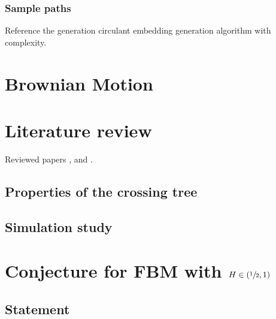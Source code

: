 \documentclass[a4paper]{report}
\begin{document}
\subsubsection{Sample paths} %
\label{ssub:sample_paths}

Reference the generation circulant embedding generation algorithm with complexity.




\section{Brownian Motion} %
\label{sec:brownian_motion}

\section{Literature review} %
\label{sec:literature_review}
Reviewed papers \cite{jones2004}, \cite{jonesshen2005} and \cite{decrouez2013}.


\subsection{Properties of the crossing tree} %
\label{sub:properties_of_the_crossing_tree}


\subsection{Simulation study} %
\label{sub:simulation_study_bm}



\section{Conjecture for FBM with $H\in (\sfrac{1}{2},1)$} %
\label{sec:conjecture_for_fbm}

\subsection{Statement} %
\label{sub:statement}
\end{document}
